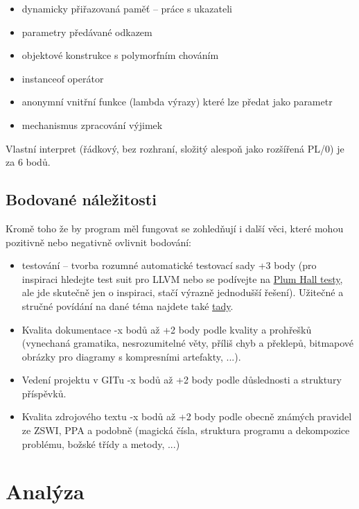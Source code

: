 \documentclass[
12pt,
a4paper,
pdftex,
czech,
titlepage
]{report}
\begin{document}
\begin{itemize}
\item dynamicky přiřazovaná paměť -- práce s ukazateli
\item parametry předávané odkazem
\item objektové konstrukce s polymorfním chováním
\item instanceof operátor
\item anonymní vnitřní funkce (lambda výrazy) které lze předat jako parametr
\item mechanismus zpracování výjimek
\end{itemize}

Vlastní interpret (řádkový, bez rozhraní, složitý alespoň jako rozšířená PL/0) je za 6 bodů. 

\section{Bodované náležitosti}

Kromě toho že by program měl fungovat se zohledňují i další věci, které mohou pozitivně nebo negativně ovlivnit bodování:

\begin{itemize}
\item testování -- tvorba rozumné automatické testovací sady +3 body (pro inspiraci hledejte test suit pro LLVM nebo se podívejte na \href{http://www.plumhall.com/suites.html}{Plum Hall testy}, ale jde skutečně jen o inspiraci, stačí výrazně jednodušší řešení). Užitečné a stručné povídání na dané téma najdete také \href{http://www.engr.mun.ca/~theo/Publications/compiler-testing.pdf}{tady}.
\item Kvalita dokumentace -x bodů až +2 body podle kvality a prohřešků (vynechaná gramatika, nesrozumitelné věty, příliš chyb a překlepů, bitmapové obrázky pro diagramy s kompresními artefakty, ...).
\item Vedení projektu v GITu -x bodů až +2 body podle důslednosti a struktury příspěvků.
\item Kvalita zdrojového textu -x bodů až +2 body podle obecně známých pravidel ze ZSWI, PPA a podobně (magická čísla, struktura programu a dekompozice problému, božské třídy a metody, ...)
\end{itemize}

\chapter{Analýza}
\end{document}
